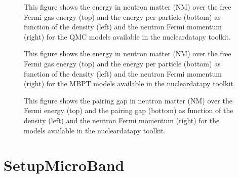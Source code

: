 \documentclass[letterpaper,10pt,english]{sphinxmanual}
\begin{document}
\begin{figure}[htbp]
\centering
\capstart

\noindent{}
\caption{This figure shows the energy in neutron matter (NM) over the free Fermi gas energy (top) and the energy per particle (bottom) as function of the density (left) and the neutron Fermi momentum (right) for the QMC models available in the nucleardatapy toolkit.}\label{\detokenize{source/api/setup_micro:id4}}\end{figure}

\begin{figure}[htbp]
\centering
\capstart

\noindent{}
\caption{This figure shows the energy in neutron matter (NM) over the free Fermi gas energy (top) and the energy per particle (bottom) as function of the density (left) and the neutron Fermi momentum (right) for the MBPT models available in the nucleardatapy toolkit.}\label{\detokenize{source/api/setup_micro:id5}}\end{figure}

\begin{figure}[htbp]
\centering
\capstart

\noindent{}
\caption{This figure shows the pairing gap in neutron matter (NM) over the Fermi energy (top) and the pairing gap (bottom) as function of the density (left) and the neutron Fermi momentum (right) for the models available in the nucleardatapy toolkit.}\label{\detokenize{source/api/setup_micro:id6}}\end{figure}

\sphinxstepscope


\section{SetupMicroBand}
\label{\detokenize{source/api/setup_micro_band:setupmicroband}}\label{\detokenize{source/api/setup_micro_band::doc}}\label{\detokenize{source/api/setup_micro_band:module-nucleardatapy.setup_micro_band}}
\end{document}
